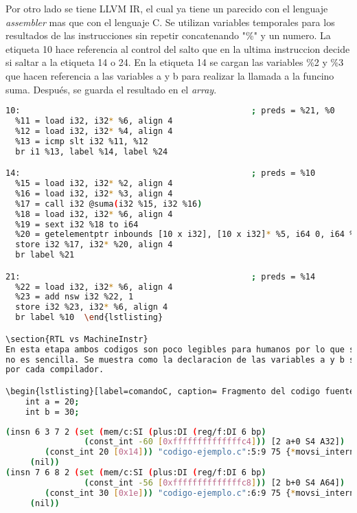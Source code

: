 Por otro lado se tiene LLVM IR, el cual ya tiene un parecido con el lenguaje \emph{assembler} 
mas que con el lenguaje C. Se utilizan variables temporales para los resultados de las 
instrucciones sin repetir concatenando "\%" y un numero. La etiqueta 10 hace referencia 
al control del salto que en la ultima instruccion decide si saltar a la etiqueta 14 o 24. 
En la etiqueta 14 se cargan las variables \%2 y \%3 que hacen referencia a las variables 
a y b para realizar la llamada a la funcino suma. Después, se guarda el resultado en 
el \emph{array}.

\begin{lstlisting}[label=comandoC, caption= Fragmento del LLVM IR de CLANG/LLVM del archivo llvm-ir.ll \cite{repositorio} para GCC., language=bash]
10:                                               ; preds = %21, %0
  %11 = load i32, i32* %6, align 4
  %12 = load i32, i32* %4, align 4
  %13 = icmp slt i32 %11, %12
  br i1 %13, label %14, label %24

14:                                               ; preds = %10
  %15 = load i32, i32* %2, align 4
  %16 = load i32, i32* %3, align 4
  %17 = call i32 @suma(i32 %15, i32 %16)
  %18 = load i32, i32* %6, align 4
  %19 = sext i32 %18 to i64
  %20 = getelementptr inbounds [10 x i32], [10 x i32]* %5, i64 0, i64 %19
  store i32 %17, i32* %20, align 4
  br label %21

21:                                               ; preds = %14
  %22 = load i32, i32* %6, align 4
  %23 = add nsw i32 %22, 1
  store i32 %23, i32* %6, align 4
  br label %10  \end{lstlisting}

\section{RTL vs MachineInstr}
En esta etapa ambos codigos son poco legibles para humanos por lo que su descripción 
no es sencilla. Se muestra como la declaracion de las variables a y b son expresadas 
por cada compilador. 

\begin{lstlisting}[label=comandoC, caption= Fragmento del codigo fuente del archivo codigo-ejemplo.c \cite{repositorio} para GCC., language=bash]
    int a = 20;
    int b = 30; \end{lstlisting}

\begin{lstlisting}[label=comandoC, caption= Fragmento de RTL de GCC del archivo codigo-ejemplo.c.330r.final \cite{repositorio} para GCC., language=bash]
(insn 6 3 7 2 (set (mem/c:SI (plus:DI (reg/f:DI 6 bp)
                (const_int -60 [0xffffffffffffffc4])) [2 a+0 S4 A32])
        (const_int 20 [0x14])) "codigo-ejemplo.c":5:9 75 {*movsi_internal}
     (nil))
(insn 7 6 8 2 (set (mem/c:SI (plus:DI (reg/f:DI 6 bp)
                (const_int -56 [0xffffffffffffffc8])) [2 b+0 S4 A64])
        (const_int 30 [0x1e])) "codigo-ejemplo.c":6:9 75 {*movsi_internal}
     (nil)) \end{lstlisting}

